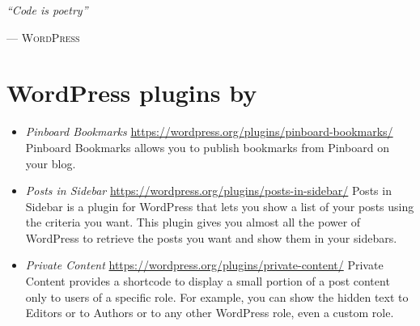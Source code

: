 \begin{flushright}
	\normalsize
	\textit{``Code is poetry''}\medskip

	\scriptsize --- \textsc{WordPress}
\end{flushright}

\vfill

\begingroup

	\small

	\section*{WordPress plugins by \myName}

	\begin{itemize}
		\item \emph{Pinboard Bookmarks}\newline
		\url{https://wordpress.org/plugins/pinboard-bookmarks/}\newline
		Pinboard Bookmarks allows you to publish bookmarks from Pinboard on your
		blog.
		\item \emph{Posts in Sidebar}\newline
		\url{https://wordpress.org/plugins/posts-in-sidebar/}\newline
		Posts in Sidebar is a plugin for WordPress that lets you show a list of
		your posts using the criteria you want. This plugin gives you almost all
		the power of WordPress to retrieve the posts you want and show them in
		your sidebars.
		\item \emph{Private Content}\newline
		\url{https://wordpress.org/plugins/private-content/}\newline
		Private Content provides a shortcode to display a small portion of a
		post content only to users of a specific role. For example, you can show
		the hidden text to Editors or to Authors or to any other WordPress role,
		even a custom role.
	\end{itemize}

\endgroup

